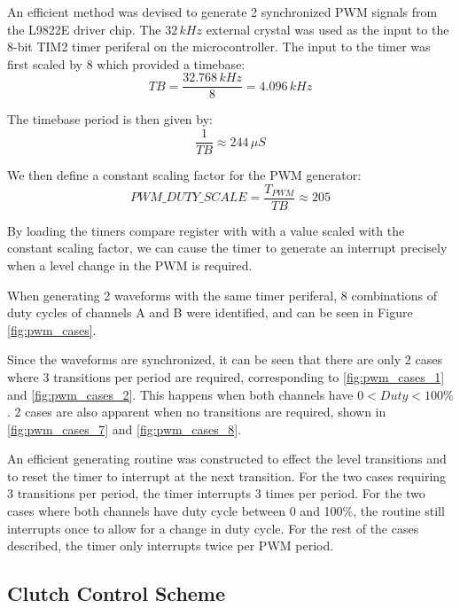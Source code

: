 An efficient method was devised to generate 2 synchronized PWM signals from the L9822E driver chip. The $32\, kHz$ external crystal was used as the input to the 8-bit TIM2 timer periferal on the microcontroller. The input to the timer was first scaled by 8 which provided a timebase:
\begin{equation}
TB=\frac{32.768\, kHz}{8}=4.096\, kHz
\end{equation}


The timebase period is then given by: \begin{equation}
\frac{1}{TB}\approx244\,\mu{S}\end{equation}


We then define a constant scaling factor for the PWM generator: \begin{equation}
{PWM\_DUTY\_SCALE}=\frac{T_{PWM}}{TB}\approx205\end{equation}


By loading the timers compare register with with a value scaled with the constant scaling factor, we can cause the timer to generate an interrupt precisely when a level change in the PWM is required.

When generating 2 waveforms with the same timer periferal, 8 combinations of duty cycles of channels A and B were identified, and can be seen in Figure \ref{fig:pwm_cases}.

Since the waveforms are synchronized, it can be seen that there are only 2 cases where 3 transitions per period are required, corresponding to \ref{fig:pwm_cases_1} and \ref{fig:pwm_cases_2}. This happens when both channels have $0<Duty<100\%$. 2 cases are also apparent when no transitions are required, shown in \ref{fig:pwm_cases_7} and \ref{fig:pwm_cases_8}.

An efficient generating routine was constructed to effect the level transitions and to reset the timer to interrupt at the next transition. For the two cases requiring 3 transitions per period, the timer interrupts 3 times per period. For the two cases where both channels have duty cycle between 0 and 100\%, the routine still interrupts once to allow for a change in duty cycle. For the rest of the cases described, the timer only interrupts twice per PWM period.




\subsection{Clutch Control Scheme}


